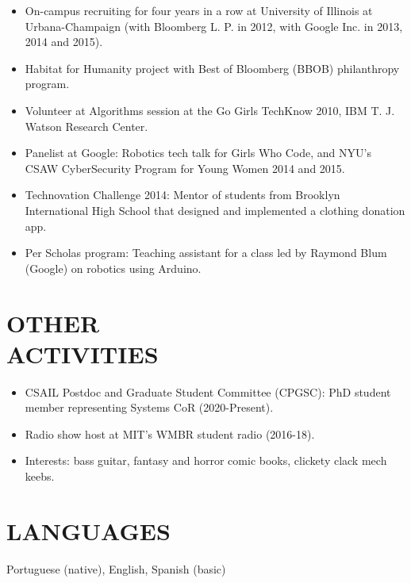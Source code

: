 \documentclass[line,margin]{res}
\begin{document}
\begin{resume}
\begin{itemize}
  \item On-campus recruiting for four years in a row at University of Illinois at Urbana-Champaign (with Bloomberg L. P. in 2012, with Google Inc. in 2013, 2014 and 2015).
  \item Habitat for Humanity project with Best of Bloomberg (BBOB) philanthropy program.
  \item Volunteer at Algorithms session at the Go Girls TechKnow 2010, IBM T. J. Watson Research Center.
  \item Panelist at Google: Robotics tech talk for Girls Who Code, and NYU's CSAW CyberSecurity Program for Young Women 2014 and 2015.
  \item Technovation Challenge 2014: Mentor of students from Brooklyn International High School that designed and implemented a clothing donation app.
  \item Per Scholas program: Teaching assistant for a class led by Raymond Blum (Google) on robotics using Arduino.
  \end{itemize}

\section{OTHER \\ ACTIVITIES}
  \begin{itemize}  \itemsep -2pt
  \item CSAIL Postdoc and Graduate Student Committee (CPGSC): PhD student member representing Systems CoR (2020-Present).
  \item Radio show host at MIT's WMBR student radio (2016-18).
  \item Interests: bass guitar, fantasy and horror comic books, clickety clack mech keebs.
  \end{itemize}

\section{LANGUAGES}
Portuguese (native), English, Spanish (basic)

\end{resume}
\end{document}
